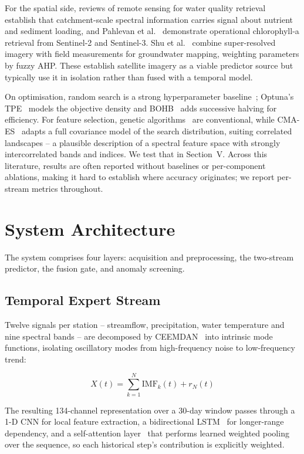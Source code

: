 \documentclass[conference]{IEEEtran}
\begin{document}
For the spatial side, reviews of remote sensing for water quality
retrieval~\cite{gholizadeh,sagan} establish that catchment-scale spectral
information carries signal about nutrient and sediment loading, and Pahlevan et
al.~\cite{pahlevan} demonstrate operational chlorophyll-a retrieval from
Sentinel-2 and Sentinel-3. Shu et al.~\cite{shu} combine super-resolved imagery
with field measurements for groundwater mapping, weighting parameters by fuzzy
AHP. These establish satellite imagery as a viable predictor source but
typically use it in isolation rather than fused with a temporal model.

On optimisation, random search is a strong hyperparameter
baseline~\cite{bergstra}; Optuna's TPE~\cite{akiba} models the objective
density and BOHB~\cite{falkner} adds successive halving for efficiency. For
feature selection, genetic algorithms~\cite{holland,dash} are conventional,
while CMA-ES~\cite{hansen} adapts a full covariance model of the search
distribution, suiting correlated landscapes -- a plausible description of a
spectral feature space with strongly intercorrelated bands and indices. We test
that in Section~V. Across this literature, results are often reported without
baselines or per-component ablations, making it hard to establish where
accuracy originates; we report per-stream metrics throughout.

\section{System Architecture}

The system comprises four layers: acquisition and preprocessing, the two-stream
predictor, the fusion gate, and anomaly screening.

\subsection{Temporal Expert Stream}

Twelve signals per station -- streamflow, precipitation, water temperature and
nine spectral bands -- are decomposed by CEEMDAN~\cite{torres} into intrinsic
mode functions, isolating oscillatory modes from high-frequency noise to
low-frequency trend:

\begin{equation}
X(t) = \sum_{k=1}^{N} \mathrm{IMF}_k(t) + r_N(t)
\end{equation}

The resulting 134-channel representation over a 30-day window passes through a
1-D CNN for local feature extraction, a bidirectional LSTM~\cite{hochreiter}
for longer-range dependency, and a self-attention layer~\cite{vaswani} that
performs learned weighted pooling over the sequence, so each historical step's
contribution is explicitly weighted.
\end{document}
